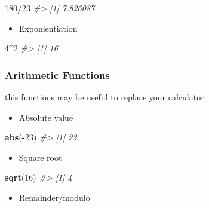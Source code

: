 \documentclass[
]{book}
\newenvironment{Shaded}{\begin{snugshade}}{\end{snugshade}}
\newcommand{\CommentTok}[1]{\textcolor[rgb]{0.56,0.35,0.01}{\textit{#1}}}
\newcommand{\DecValTok}[1]{\textcolor[rgb]{0.00,0.00,0.81}{#1}}
\newcommand{\FunctionTok}[1]{\textcolor[rgb]{0.13,0.29,0.53}{\textbf{#1}}}
\newcommand{\NormalTok}[1]{#1}
\newcommand{\SpecialCharTok}[1]{\textcolor[rgb]{0.81,0.36,0.00}{\textbf{#1}}}
\providecommand{\tightlist}{%
  \setlength{\itemsep}{0pt}\setlength{\parskip}{0pt}}
\begin{document}
\begin{Shaded}
\begin{Highlighting}[]
\DecValTok{180}\SpecialCharTok{/}\DecValTok{23}
\CommentTok{\#\textgreater{} [1] 7.826087}
\end{Highlighting}
\end{Shaded}

\begin{itemize}
\tightlist
\item
  Exponientiation
\end{itemize}

\begin{Shaded}
\begin{Highlighting}[]
\DecValTok{4}\SpecialCharTok{\^{}}\DecValTok{2}
\CommentTok{\#\textgreater{} [1] 16}
\end{Highlighting}
\end{Shaded}

\subsubsection*{Arithmetic Functions}\label{arithmetic-functions}

this functions may be useful to replace your calculator

\begin{itemize}
\tightlist
\item
  Absolute value
\end{itemize}

\begin{Shaded}
\begin{Highlighting}[]
\FunctionTok{abs}\NormalTok{(}\SpecialCharTok{{-}}\DecValTok{23}\NormalTok{)}
\CommentTok{\#\textgreater{} [1] 23}
\end{Highlighting}
\end{Shaded}

\begin{itemize}
\tightlist
\item
  Square root
\end{itemize}

\begin{Shaded}
\begin{Highlighting}[]
\FunctionTok{sqrt}\NormalTok{(}\DecValTok{16}\NormalTok{)}
\CommentTok{\#\textgreater{} [1] 4}
\end{Highlighting}
\end{Shaded}

\begin{itemize}
\tightlist
\item
  Remainder/modulo
\end{itemize}
\end{document}
